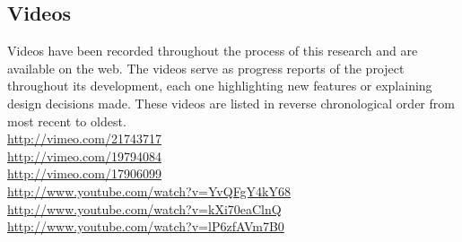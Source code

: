 \pagebreak
\clearpage



\subsection{Videos}

Videos have been recorded throughout the process of this research and are
available on the web. The videos serve as progress reports of the project
throughout its development, each one highlighting new features or explaining
design decisions made. These videos are listed in reverse chronological order
from most recent to oldest. \\
\url{http://vimeo.com/21743717} \\
\url{http://vimeo.com/19794084} \\
\url{http://vimeo.com/17906099} \\
\url{http://www.youtube.com/watch?v=YvQFgY4kY68} \\
\url{http://www.youtube.com/watch?v=kXi70eaClnQ} \\
\url{http://www.youtube.com/watch?v=lP6zfAVm7B0} \\



